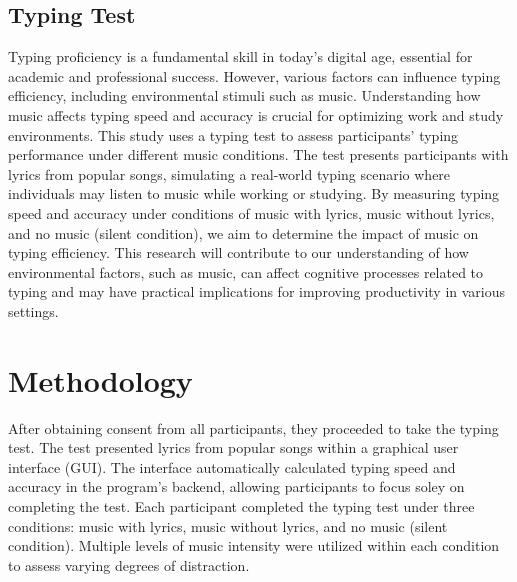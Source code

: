 \documentclass[manuscript, screen, review]{acmart} %
\begin{document}
\subsection{Typing Test}
Typing proficiency is a fundamental skill in today's digital age, essential for academic and professional success. However, various factors can influence typing efficiency, including environmental stimuli such as music. Understanding how music affects typing speed and accuracy is crucial for optimizing work and study environments.
This study uses a typing test to assess participants' typing performance under different music conditions. The test presents participants with lyrics from popular songs, simulating a real-world typing scenario where individuals may listen to music while working or studying.
By measuring typing speed and accuracy under conditions of music with lyrics, music without lyrics, and no music (silent condition), we aim to determine the impact of music on typing efficiency. This research will contribute to our understanding of how environmental factors, such as music, can affect cognitive processes related to typing and may have practical implications for improving productivity in various settings.


\section{Methodology}
After obtaining consent from all participants, they proceeded to take the typing test. The test presented lyrics from popular songs within a graphical user interface (GUI). 
The interface automatically calculated typing speed and accuracy in the program's backend, allowing participants to focus soley on completing the test.
Each participant completed the typing test under three conditions: music with lyrics, music without lyrics, and no music (silent condition).
Multiple levels of music intensity were utilized within each condition to assess varying degrees of distraction.
\end{document}
